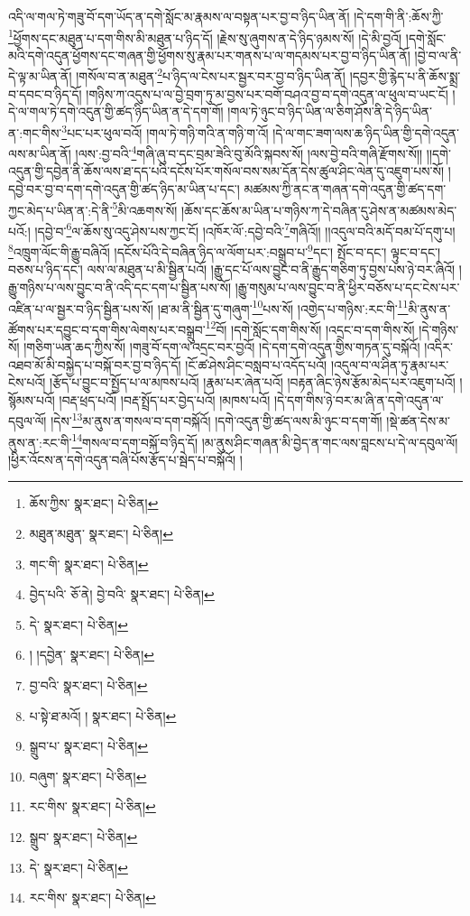 འདི་ལ་གལ་ཏེ་གཟུ་བོ་དག་ཡོད་ན་དགེ་སློང་མ་རྣམས་ལ་བསྟན་པར་བྱ་བ་ཉིད་ཡིན་ནོ། །དེ་དག་གི་ནི་:ཆོས་ཀྱི་\footnote{ཆོས་ཀྱིས་  སྣར་ཐང་།  པེ་ཅིན། }ཕྱོགས་དང་མཐུན་པ་དག་གིས་མི་མཐུན་པ་ཉིད་དོ། །རྗེས་སུ་ཞུགས་ན་དེ་ཉིད་ཉམས་སོ། །དེ་མི་བྱའོ། །དགེ་སློང་མའི་དགེ་འདུན་ཕྱོགས་དང་གཞན་གྱི་ཕྱོགས་སུ་རྣམ་པར་གནས་པ་ལ་གདམས་པར་བྱ་བ་ཉིད་ཡིན་ནོ། །བྱེ་བ་ལ་ནི་དེ་ལྟ་མ་ཡིན་ནོ། །གསོལ་བ་ན་མཐུན་\footnote{མཐུན་མཐུན་  སྣར་ཐང་།  པེ་ཅིན། }པ་ཉིད་ལ་ངེས་པར་སྦྱར་བར་བྱ་བ་ཉིད་ཡིན་ནོ། །དབྱར་གྱི་རྙེད་པ་ནི་ཆོས་སྨྲ་བ་དབང་བ་ཉིད་དོ། །གཉིས་ཀ་འདུས་པ་ལ་བྱེ་བྲག་ཏུ་མ་བྱས་པར་བགོ་བཤའ་བྱ་བ་དགེ་འདུན་ལ་ཕུལ་བ་ཡང་ངོ། །དེ་ལ་གལ་ཏེ་དགེ་འདུན་གྱི་ཚད་ཉིད་ཡིན་ན་དེ་དག་གོ། །གལ་ཏེ་ཉུང་བ་ཉིད་ཡིན་ལ་ཅིག་ཤོས་ནི་དེ་ཉིད་ཡིན་ན་:གང་གིས་\footnote{གང་གི་  སྣར་ཐང་།  པེ་ཅིན། }པང་པར་ཕུལ་བའོ། །གལ་ཏེ་གཉི་གའི་ན་གཉི་ག་འོ། །དེ་ལ་གང་ཟག་ལས་ཆ་ཉིད་ཡིན་གྱི་དགེ་འདུན་ལས་མ་ཡིན་ནོ། །ལས་:བྱ་བའི་\footnote{བྱེད་པའི་  ཅོ་ནེ། བྱེ་བའི་  སྣར་ཐང་།  པེ་ཅིན། }གཞི་ཞུ་བ་དང་བྲམ་ཟེའི་བུ་མོའི་སྐབས་སོ། །ལས་བྱེ་བའི་གཞི་རྫོགས་སོ།། །།དགེ་འདུན་གྱི་དབྱེན་ནི་ཆོས་ལས་ཐ་དད་པའི་དངོས་པོར་གསོལ་བས་སམ་དོན་དེས་ཚུལ་ཤིང་ལེན་དུ་འཇུག་པས་སོ། །དབྱེ་བར་བྱ་བ་དག་དགེ་འདུན་གྱི་ཚད་ཉིད་མ་ཡིན་པ་དང་། མཚམས་ཀྱི་ནང་ན་གཞན་དགེ་འདུན་གྱི་ཚད་དག་ཀྱང་མེད་པ་ཡིན་ན་:དེ་ནི་\footnote{དེ་  སྣར་ཐང་།  པེ་ཅིན། }མི་འཆགས་སོ། །ཆོས་དང་ཆོས་མ་ཡིན་པ་གཉིས་ཀ་དེ་བཞིན་དུ་ཤེས་ན་མཚམས་མེད་པའོ:། །དབྱེ་བ་\footnote{། །དབྱེན་  སྣར་ཐང་།  པེ་ཅིན། }ལ་ཆོས་སུ་འདུ་ཤེས་པས་ཀྱང་ངོ། །འཁོར་ལོ་:དབྱེ་བའི་\footnote{བྱ་བའི་  སྣར་ཐང་།  པེ་ཅིན། }གཞིའོ།། །།འདུལ་བའི་མདོ་བམ་པོ་དགུ་པ། \footnote{པ་སྟེ་ཐ་མའོ། །   སྣར་ཐང་།  པེ་ཅིན། }འཁྲུག་ལོང་གི་རྒྱུ་བཞིའོ། །དངོས་པོའི་དེ་བཞིན་ཉིད་ལ་ལོག་པར་:བསྒྲུབ་པ་\footnote{སྒྲུབ་པ་  སྣར་ཐང་།  པེ་ཅིན། }དང་། སྤོང་བ་དང་། ལྟུང་བ་དང་། བཅས་པ་ཉིད་དང་། ལས་ལ་མཐུན་པ་མི་སྦྱིན་པའོ། །རྒྱུ་དང་པོ་ལས་བྱུང་བ་ནི་རྒྱུད་གཅིག་ཏུ་བྱས་པས་ཉེ་བར་ཞིའོ། །རྒྱུ་གཉིས་པ་ལས་བྱུང་བ་ནི་འདི་དང་དག་པ་སྦྱིན་པས་སོ། །རྒྱུ་གསུམ་པ་ལས་བྱུང་བ་ནི་ཕྱིར་བཅོས་པ་དང་ངེས་པར་འཛིན་པ་ལ་སྦྱར་བ་ཉིད་སྦྱིན་པས་སོ། །ཐ་མ་ནི་སྦྱིན་དུ་གཞུག་\footnote{བཞུག་  སྣར་ཐང་།  པེ་ཅིན། }པས་སོ། །འགྱེད་པ་གཉིས་:རང་གི་\footnote{རང་གིས་  སྣར་ཐང་།  པེ་ཅིན། }མི་ནུས་ན་ཚོགས་པར་དབྱུང་བ་དག་གིས་ལེགས་པར་བསྒྲུབ་\footnote{སྒྲུབ་  སྣར་ཐང་།  པེ་ཅིན། }བོ། །དགེ་སློང་དག་གིས་སོ། །འདྲང་བ་དག་གིས་སོ། །དེ་གཉིས་སོ། །གཅིག་ཡན་ཆད་ཀྱིས་སོ། །གཟུ་བོ་དག་ལ་འདྲང་བར་བྱའོ། །དེ་དག་དགེ་འདུན་གྱིས་གཏན་དུ་བསྐོའོ། །འདིར་འཐབ་མོ་མི་བསྐྱེད་པ་བསྐོ་བར་བྱ་བ་ཉིད་དོ། །ངོ་ཚ་ཤེས་ཤིང་བསླབ་པ་འདོད་པའོ། །འདུལ་བ་ལ་ཤིན་ཏུ་རྣམ་པར་ངེས་པའོ། །རྩོད་པ་བྱུང་བ་སྤྱོད་པ་ལ་མཁས་པའོ། །རྣམ་པར་ཞེན་པའོ། །བརྟན་ཞིང་ཉེས་རྩོམ་མེད་པར་འཇུག་པའོ། །སྙོམས་པའོ། །བརྡ་ཕྲད་པའོ། །བརྡ་སྤྲོད་པར་བྱེད་པའོ། །མཁས་པའོ། །དེ་དག་གིས་ཉེ་བར་མ་ཞི་ན་དགེ་འདུན་ལ་དབུལ་ལོ། །དེས་\footnote{དེ་  སྣར་ཐང་།  པེ་ཅིན། }མ་ནུས་ན་གསལ་བ་དག་བསྐོའོ། །དགེ་འདུན་གྱི་ཚད་ལས་མི་ཉུང་བ་དག་གོ། །སྡེ་ཚན་དེས་མ་ནུས་ན་:རང་གི་\footnote{རང་གིས་  སྣར་ཐང་།  པེ་ཅིན། }གསལ་བ་དག་བསྐོ་བ་ཉིད་དོ། །མ་ནུས་ཤིང་གཞན་མི་བྱེད་ན་གང་ལས་བླངས་པ་དེ་ལ་དབུལ་ལོ། །ཕྱིར་འོངས་ན་དགེ་འདུན་བཞི་པོས་རྩོད་པ་སྦེད་པ་བསྐོའོ། །
